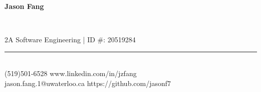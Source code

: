 \documentclass[10pt]{article}
\begin{document}
\thispagestyle{empty}

\begin{center}
\begin{LARGE}\textbf{Jason Fang}\end{LARGE}\\
\vspace{2pt}
\begin{normalsize}2A Software Engineering | ID \#: 20519284\end{normalsize} 
\vspace{-8pt}
\end{center}

\rule{510pt}{1pt} \\
(519)501-6528 \hspace{4.45in} www.linkedin.com/in/jzfang\\ 
jason.fang.1@uwaterloo.ca\hspace{3.8in} https://github.com/jasonf7\\
\end{document}
